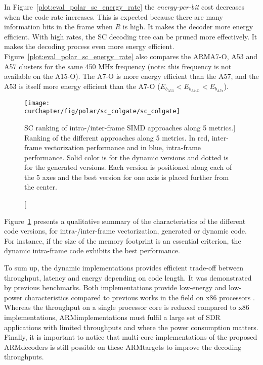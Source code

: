 In Figure~\ref{plot:eval_polar_sc_energy_rate} the \emph{energy-per-bit} cost
decreases when the code rate increases. This is expected because there are many
information bits in the frame when $R$ is high. It makes the decoder more
energy efficient. With high rates, the SC decoding tree can be pruned more
effectively. It makes the decoding process even more energy efficient.
Figure~\ref{plot:eval_polar_sc_energy_rate} also compares the ARM\R A7-O, A53
and A57 clusters for the same 450 MHz frequency (note: this frequency is not
available on the A15-O). The \little A7-O is more energy efficient than the
\bigARM A57, and the \little A53 is itself more energy efficient than the
\little A7-O ($E_{b_{\text{A53}}} < E_{b_{\text{A7-O}}} < E_{b_{\text{A57}}}$).

\begin{figure}[htp]
  \centering
  \texttt{[image: \\curChapter/fig/polar/sc\_colgate/sc\_colgate]}
  \caption
    [SC ranking of intra-/inter-frame SIMD approaches along 5 metrics.]
    {Ranking of the different approaches along
     5 metrics. In red, inter-frame vectorization performance and in blue,
     intra-frame performance. Solid color is for the dynamic versions and dotted
     is for the generated versions. Each version is positioned along each of the
     5 axes and the best version for one axis is placed further from the
     center.}
  \label{fig:eval_polar_sc_colgate}
\end{figure}

Figure~\ref{fig:eval_polar_sc_colgate} presents a qualitative summary of the
characteristics of the different code versions, for intra-/inter-frame
vectorization, generated or dynamic code. For instance, if the size of
the memory footprint is an essential criterion, the dynamic intra-frame
code exhibits the best performance.

To sum up, the dynamic implementations provides efficient trade-off between
throughput, latency and energy depending on code length. It was demonstrated by
previous benchmarks. Both implementations provide low-energy and low-power
characteristics compared to previous works in the field on x86 processors
\cite{Sarkis2014,Giard2014,Sarkis2014a,LeGal2014,LeGal2015a,Cassagne2015c}.
Whereas the throughput on a single processor core is reduced compared to x86
implementations, ARM\R implementations must fulfil a large set of SDR
applications with limited throughputs and where the power consumption matters.
Finally, it is important to notice that multi-core implementations of the
proposed ARM\R decoders is still possible on these ARM\R targets to improve the
decoding throughputs.

